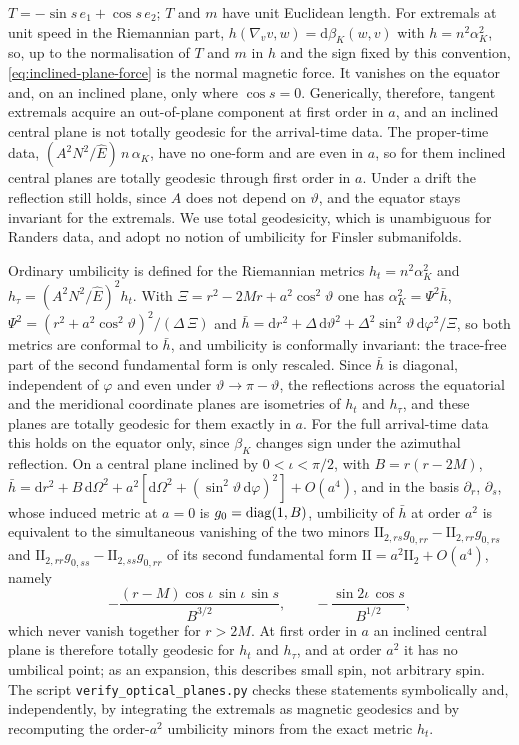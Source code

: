 \documentclass[12pt]{iopart}
\theoremstyle{plain}
\theoremstyle{definition}
\theoremstyle{remark}
\newcommand{\Ehat}{\hat E}
\newcommand{\dd}{\mathrm{d}}
\begin{document}
$T=-\sin s\,e_1+\cos s\,e_2$; $T$ and $m$ have unit Euclidean length. For extremals at unit
speed in the Riemannian part, $h(\nabla_vv,w)=\dd\beta_K(w,v)$ with $h=n^2\alpha_K^2$, so,
up to the normalisation of $T$ and $m$ in $h$ and the sign fixed by this convention,
\eqref{eq:inclined-plane-force} is the normal magnetic force. It vanishes on the equator and,
on an inclined plane, only where $\cos s=0$. Generically, therefore, tangent extremals acquire
an out-of-plane component at first order in $a$, and an inclined central plane is not
totally geodesic for the arrival-time data. The proper-time data,
$(A^2N^2/\Ehat)\,n\,\alpha_K$, have no one-form and are even in $a$, so for them inclined
central planes are totally geodesic through first order in $a$. Under a drift the reflection still holds, since $A$ does not depend on
$\vartheta$, and the equator stays invariant for the extremals. We use total geodesicity,
which is unambiguous for Randers data, and adopt no notion of umbilicity for Finsler
submanifolds.

Ordinary umbilicity is defined for the Riemannian metrics $h_t=n^2\alpha_K^2$ and
$h_\tau=(A^2N^2/\Ehat)^2h_t$. With $\Xi=r^2-2Mr+a^2\cos^2\vartheta$ one has $\alpha_K^2=\Psi^2\bar h$,
$\Psi^2=(r^2+a^2\cos^2\vartheta)^2/(\Delta\,\Xi)$ and
$\bar h=\dd r^2+\Delta\,\dd\vartheta^2+\Delta^2\sin^2\vartheta\,\dd\varphi^2/\Xi$, so both metrics
are conformal to $\bar h$, and umbilicity is conformally invariant: the trace-free part of the
second fundamental form is only rescaled. Since $\bar h$ is diagonal, independent of
$\varphi$ and even under $\vartheta\to\pi-\vartheta$, the reflections across the equatorial
and the meridional coordinate planes are isometries of $h_t$ and $h_\tau$, and these planes
are totally geodesic for them exactly in $a$. For the full arrival-time data this holds on
the equator only, since $\beta_K$ changes sign under the azimuthal reflection. On a central
plane inclined by $0<\iota<\pi/2$, with $B=r(r-2M)$,
$\bar h=\dd r^2+B\,\dd\Omega^2+a^2[\dd\Omega^2+(\sin^2\vartheta\,\dd\varphi)^2]+O(a^4)$, and in the
basis $\partial_r$, $\partial_s$, whose induced metric at $a=0$ is $g_0={\rm diag}(1,B)$,
umbilicity of $\bar h$ at order $a^2$ is equivalent to the simultaneous vanishing of the two
minors $\mathrm{II}_{2,rs}g_{0,rr}-\mathrm{II}_{2,rr}g_{0,rs}$ and
$\mathrm{II}_{2,rr}g_{0,ss}-\mathrm{II}_{2,ss}g_{0,rr}$ of its second fundamental form
$\mathrm{II}=a^2\mathrm{II}_2+O(a^4)$, namely
\begin{equation}
    -\frac{(r-M)\cos\iota\,\sin\iota\,\sin s}{B^{3/2}},\qquad
    -\frac{\sin 2\iota\,\cos s}{B^{1/2}},
    \label{eq:inclined-plane-umbilicity}
\end{equation}
which never vanish together for $r>2M$. At first order in $a$ an inclined central plane is
therefore totally geodesic for $h_t$ and $h_\tau$, and at order $a^2$ it has no umbilical
point; as an expansion, this describes small spin, not arbitrary spin. The script
\texttt{verify\_optical\_planes.py} checks these statements symbolically and, independently,
by integrating the extremals as magnetic geodesics and by recomputing the order-$a^2$
umbilicity minors from the exact metric $h_t$.
\end{document}
